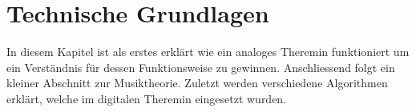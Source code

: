 \clearpage
\section{Technische Grundlagen}\label{sec:Technische Grundlagen}
In diesem Kapitel ist als erstes erklärt wie ein analoges Theremin funktioniert um ein Verständnis für dessen Funktionsweise zu gewinnen. Anschliessend folgt ein kleiner Abschnitt zur Musiktheorie. Zuletzt werden verschiedene Algorithmen erklärt, welche im digitalen Theremin eingesetzt wurden.
